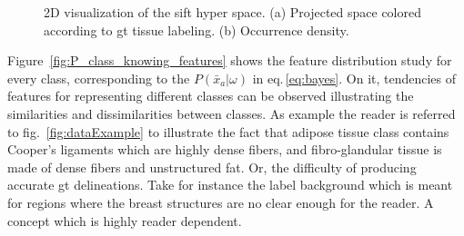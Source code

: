 \documentclass[a4paper, 10pt, conference]{llncs}      %
\begin{document}
\begin{figure}[Htbp]
\centering
\quad
{}

\caption{2D visualization of the \acs{sift} hyper space. (a) Projected space colored according to \acs{gt} tissue labeling. (b) Occurrence density.}
\label{fig:siftMapping}
\end{figure}



Figure~\ref{fig:P_class_knowing_features} shows the feature distribution study for every class, corresponding to the $P(\bar{x}_a|\omega)$ in eq.\,\ref{eq:bayes}. On it, tendencies of features for representing different classes can be observed illustrating the similarities and dissimilarities between classes. As example the reader is referred to fig.~\ref{fig:dataExample} to illustrate the fact that adipose tissue class contains Cooper's ligaments which are highly dense fibers, and fibro-glandular tissue is made of dense fibers and unstructured fat. Or, the difficulty of producing accurate \ac{gt} delineations. Take for instance the label background which is meant for regions where the breast structures are no clear enough for the reader. A concept which is highly reader dependent.
\end{document}
